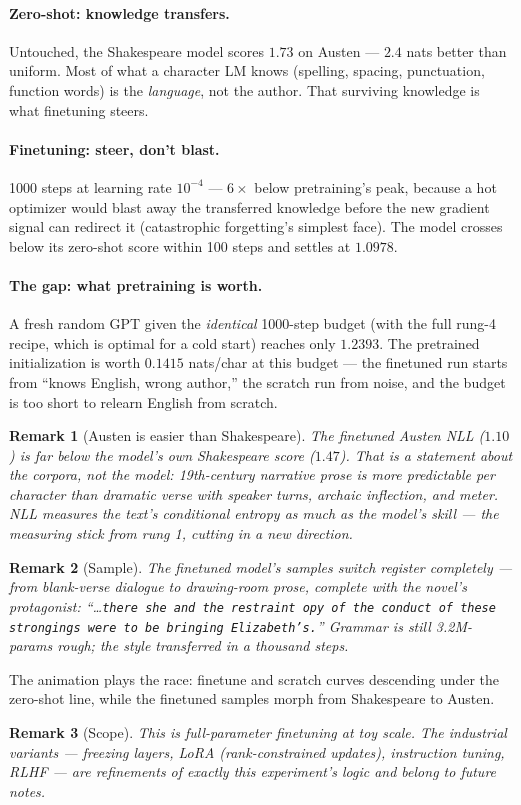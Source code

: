 \documentclass[11pt]{article}
\newtheorem{remark}{Remark}
\begin{document}
\paragraph{Zero-shot: knowledge transfers.} Untouched, the
Shakespeare model scores $1.73$ on Austen --- $2.4$ nats better than
uniform. Most of what a character LM knows (spelling, spacing,
punctuation, function words) is the \emph{language}, not the author.
That surviving knowledge is what finetuning steers.

\paragraph{Finetuning: steer, don't blast.} 1000 steps at learning
rate $10^{-4}$ --- $6\times$ below pretraining's peak, because a hot
optimizer would blast away the transferred knowledge before the new
gradient signal can redirect it (catastrophic forgetting's simplest
face). The model crosses below its zero-shot score within 100 steps
and settles at $1.0978$.

\paragraph{The gap: what pretraining is worth.} A fresh random GPT
given the \emph{identical} 1000-step budget (with the full rung-4
recipe, which is optimal for a cold start) reaches only $1.2393$. The
pretrained initialization is worth $0.1415$ nats/char at this budget
--- the finetuned run starts from ``knows English, wrong author,''
the scratch run from noise, and the budget is too short to relearn
English from scratch.

\begin{remark}[Austen is easier than Shakespeare]
The finetuned Austen NLL ($1.10$) is far below the model's own
Shakespeare score ($1.47$). That is a statement about the
\emph{corpora}, not the model: 19th-century narrative prose is more
predictable per character than dramatic verse with speaker turns,
archaic inflection, and meter. NLL measures the text's conditional
entropy as much as the model's skill --- the measuring stick from
rung 1, cutting in a new direction.
\end{remark}

\begin{remark}[Sample]
The finetuned model's samples switch register completely --- from
blank-verse dialogue to drawing-room prose, complete with the novel's
protagonist: ``\ldots\texttt{there she and the restraint opy of the
conduct of these strongings were to be bringing Elizabeth's.}''
Grammar is still 3.2M-params rough; the \emph{style} transferred in a
thousand steps.
\end{remark}

The animation plays the race: finetune and scratch curves descending
under the zero-shot line, while the finetuned samples morph from
Shakespeare to Austen.

\begin{remark}[Scope]
This is full-parameter finetuning at toy scale. The industrial
variants --- freezing layers, LoRA (rank-constrained updates),
instruction tuning, RLHF --- are refinements of exactly this
experiment's logic and belong to future notes.
\end{remark}
\end{document}
